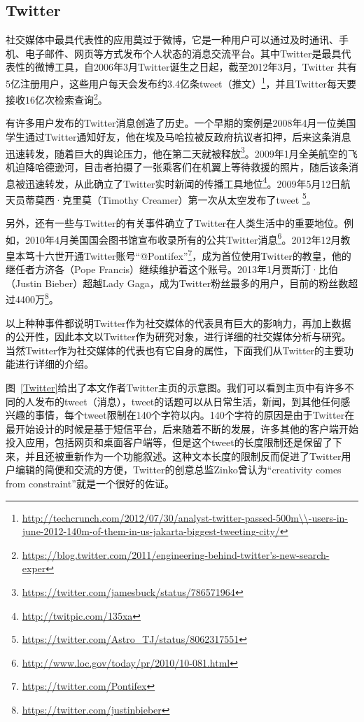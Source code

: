 \subsection{Twitter}
社交媒体中最具代表性的应用莫过于微博，它是一种用户可以通过及时通讯、手机、电子邮件、网页等方式发布个人状态的消息交流平台。其中Twitter是最具代表性的微博工具，自2006年3月Twitter诞生之日起，截至2012年3月，Twitter 共有5亿注册用户，这些用户每天会发布约3.4亿条tweet（推文）\footnote{\url{http://techcrunch.com/2012/07/30/analyst-twitter-passed-500m\\-users-in-june-2012-140m-of-them-in-us-jakarta-biggest-tweeting-city/}}，并且Twitter每天要接收16亿次检索查询\footnote{\url{https://blog.twitter.com/2011/engineering-behind-twitter's-new-search-exper}}。

有许多用户发布的Twitter消息创造了历史。一个早期的案例是2008年4月一位美国学生通过Twitter通知好友，他在埃及马哈拉被反政府抗议者扣押，后来这条消息迅速转发，随着巨大的舆论压力，他在第二天就被释放\footnote{\url{https://twitter.com/jamesbuck/status/786571964}}。2009年1月全美航空的飞机迫降哈德逊河，目击者拍摄了一张乘客们在机翼上等待救援的照片，随后该条消息被迅速转发，从此确立了Twitter实时新闻的传播工具地位\footnote{\url{http://twitpic.com/135xa}}。2009年5月12日航天员蒂莫西·克里莫（Timothy Creamer）第一次从太空发布了tweet \footnote{\url{https://twitter.com/Astro_TJ/status/8062317551}}。

另外，还有一些与Twitter的有关事件确立了Twitter在人类生活中的重要地位。例如，2010年4月美国国会图书馆宣布收录所有的公共Twitter消息\footnote{\url{http://www.loc.gov/today/pr/2010/10-081.html}}。2012年12月教皇本笃十六世开通Twitter账号“@Pontifex”\footnote{\url{https://twitter.com/Pontifex}}，成为首位使用Twitter的教皇，他的继任者方济各（Pope Francis）继续维护着这个账号。2013年1月贾斯汀·比伯（Justin Bieber）超越Lady Gaga，成为Twitter粉丝最多的用户，目前的粉丝数超过4400万\footnote{\url{https://twitter.com/justinbieber}}。

以上种种事件都说明Twitter作为社交媒体的代表具有巨大的影响力，再加上数据的公开性，因此本文以Twitter作为研究对象，进行详细的社交媒体分析与研究。当然Twitter作为社交媒体的代表也有它自身的属性，下面我们从Twitter的主要功能进行详细的介绍。

图~\ref{Twitter}给出了本文作者Twitter主页的示意图。我们可以看到主页中有许多不同的人发布的tweet（消息），tweet的话题可以从日常生活，新闻，到其他任何感兴趣的事情，每个tweet限制在140个字符以内。140个字符的原因是由于Twitter在最开始设计的时候是基于短信平台，后来随着不断的发展，许多其他的客户端开始投入应用，包括网页和桌面客户端等，但是这个tweet的长度限制还是保留了下来，并且还被重新作为一个功能叙述。这种文本长度的限制反而促进了Twitter用户编辑的简便和交流的方便，Twitter的创意总监Zinko曾认为“creativity comes from constraint”就是一个很好的佐证。


